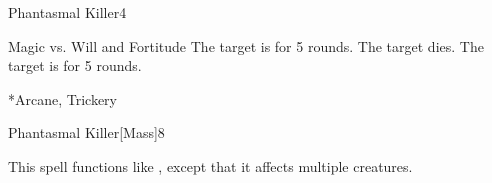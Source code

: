 \begin{spellsection}{Phantasmal Killer}{4}
    \begin{spellheader}
    \end{spellheader}
    \begin{spellcontent}
        \begin{spelltargetinginfo}
        \end{spelltargetinginfo}
        \begin{spelleffects}
            \begin{spellattack}{Magic vs. Will and Fortitude}
                \spellsuccess[Will] The target is \frightened for 5 rounds.
                 The target dies.
                \spellfailure The target is \shaken for 5 rounds.
            \end{spellattack}
        \end{spelleffects}
    \end{spellcontent}
    \begin{spellfooter}
        *{Arcane, Trickery}
        \miscastrandom
    \end{spellfooter}
\end{spellsection}

\begin{spellsection}{Phantasmal Killer}[Mass]{8}
    \begin{spellheader}
    \end{spellheader}
    \begin{spellcontent}
        \begin{spelltargetinginfo}
        \end{spelltargetinginfo}
        \begin{spelleffects}
            \spellspecial This spell functions like , except that it affects multiple creatures.
        \end{spelleffects}
    \end{spellcontent}
    \begin{spellfooter}
        \miscastexplode
    \end{spellfooter}
\end{spellsection}

